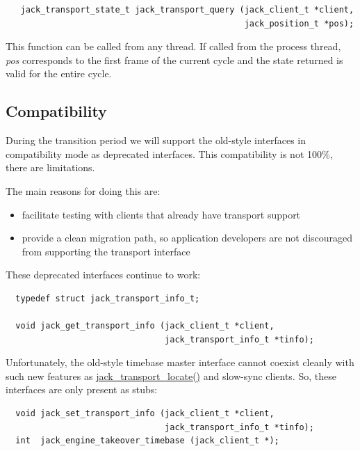 \footnotesize\begin{verbatim}   jack_transport_state_t jack_transport_query (jack_client_t *client,
                                                jack_position_t *pos);
\end{verbatim}
\normalsize


This function can be called from any thread. If called from the process thread, {\em pos\/} corresponds to the first frame of the current cycle and the state returned is valid for the entire cycle.\hypertarget{transport-design_compatibility}{}\subsection{Compatibility}\label{transport-design_compatibility}
During the transition period we will support the old-style interfaces in compatibility mode as deprecated interfaces. This compatibility is not 100\%, there are limitations.

The main reasons for doing this are:

\begin{itemize}
\item facilitate testing with clients that already have transport support\item provide a clean migration path, so application developers are not discouraged from supporting the transport interface\end{itemize}


These deprecated interfaces continue to work:



\footnotesize\begin{verbatim}  typedef struct jack_transport_info_t;

  void jack_get_transport_info (jack_client_t *client,
                                jack_transport_info_t *tinfo);
\end{verbatim}
\normalsize


Unfortunately, the old-style timebase master interface cannot coexist cleanly with such new features as \hyperlink{transport_8h_683f8877d18010277fd4e1b0b658e075}{jack\_\-transport\_\-locate()} and slow-sync clients. So, these interfaces are only present as stubs:



\footnotesize\begin{verbatim}  void jack_set_transport_info (jack_client_t *client,
                                jack_transport_info_t *tinfo);
  int  jack_engine_takeover_timebase (jack_client_t *);
\end{verbatim}
\normalsize


